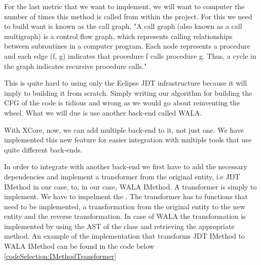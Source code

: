         For the last metric that we want to implement, we will want to computer the number of times this method is called from within the project. For this we need to build want is known
as the call graph. "A call graph (also known as a call multigraph) is a control flow graph, which represents calling relationships between subroutines in a computer program. Each node represents a procedure and each edge (f, g) indicates that procedure f calls procedure g. Thus, a cycle in the graph indicates recursive procedure calls." \cite{wiki:CG}

        This is quite hard to using only the Eclipse JDT infrastructure because it will imply to building it from scratch. Simply writing our algorithm for building the CFG of the code is tidious and wrong as we would go about reinventing the wheel. 
What we will due is use another back-end called WALA. 
        
        With XCore, now, we can add multiple back-end to it, not just one. We have implemented this new feature for easier integration with multiple tools that use quite different back-ends. 

        In order to integrate with another back-end we first have to add the necessary dependencies and implement a transformer from the original entity, i.e JDT IMethod in our case, to, in our case, WALA IMethod.
A transformer is simply to implement. We have to impelment the . The transformer has to functions that need to be implemented, a transformation from the original entity to 
the new entity and the reverse transformation. In case of WALA the transformation is implemented by using the AST of the class and retrieving the appropriate method. An example of the implementation that transforms JDT IMethod to WALA IMethod can be found in the code below
\ref{codeSelection:IMethodTransformer}

